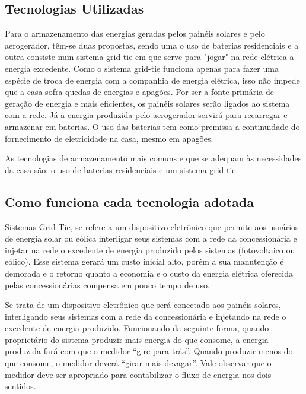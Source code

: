 \subsection{Tecnologias Utilizadas}

	Para o armazenamento das energias geradas pelos painéis solares e pelo aerogerador, têm-se duas propostas, sendo uma o uso de baterias residenciais e a outra consiste num sistema grid-tie em que serve para "jogar" na rede elétrica a energia excedente. Como o sistema grid-tie funciona apenas para fazer uma espécie de troca de energia com a companhia de energia elétrica, isso não impede que a casa sofra quedas de energias e apagões. Por ser a fonte primária de geração de energia e mais eficientes, os painéis solares serão ligados ao sistema com a rede. Já a energia produzida pelo aerogerador servirá para recarregar e armazenar em baterias. O uso das baterias tem como premissa a continuidade do fornecimento de eletricidade na casa, mesmo em apagões.

	As tecnologias de armazenamento mais comuns e que se adequam às necessidades da casa são: o uso de baterias residenciais e um sistema grid tie.

\subsection{Como funciona cada tecnologia adotada}

	Sistemas Grid-Tie, se refere a um dispositivo eletrônico que permite aos usuários de energia solar ou eólica interligar seus sistemas com a rede da concessionária e injetar na rede o excedente de energia produzido pelos sistemas (fotovoltaico ou eólico). Esse sistema gerará um custo inicial alto, porém a sua manutenção é demorada e o retorno quanto a economia e o custo da energia elétrica oferecida pelas concessionárias compensa em pouco tempo de uso.

	Se trata de um dispositivo eletrônico que será conectado aos painéis solares, interligando seus sistemas com a rede da concessionária e injetando na rede o excedente de energia produzido. Funcionando da seguinte forma, quando proprietário do sistema produzir mais energia do que consome, a energia produzida fará com que o medidor “gire para trás”. Quando produzir menos do que consome, o medidor deverá “girar mais devagar”. Vale observar que o medidor deve ser apropriado para contabilizar o fluxo de energia nos dois sentidos.

